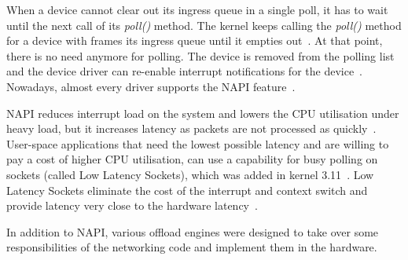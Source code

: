 When a device cannot clear out its ingress queue in a single poll,
it has to wait until the next call of its {\it{poll()}} method.
The kernel keeps calling the {\it{poll()}} method for a device with frames its ingress
queue until it empties out~\cite{understanding-internals}.
At that point, there is no need anymore for polling.
The device is removed from the polling list
and the device driver can re-enable interrupt notifications for the device~\cite{understanding-internals}.
Nowadays, almost every driver supports the NAPI feature~\cite{linux-kernel-networking}.

NAPI reduces interrupt load on the system and lowers the CPU utilisation under heavy load,
but it increases latency as packets are not processed as quickly~\cite{linux-foundation-napi}.
User-space applications that need the lowest
possible latency and are willing to pay a cost of higher CPU utilisation,
can use a capability for busy polling on sockets (called Low Latency Sockets), which was added in kernel 3.11~\cite{linux-kernel-networking}.
Low Latency Sockets eliminate the cost of the interrupt and context switch
and provide latency very close to the hardware latency~\cite{intel-lls}.

In addition to NAPI, various offload engines were designed to take over some responsibilities of the networking code
and implement them in the hardware.
